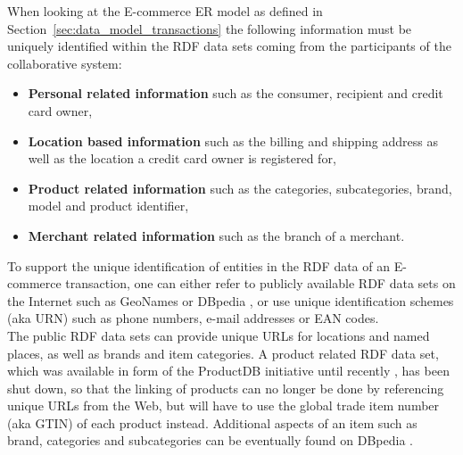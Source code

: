 When looking at the \gls{E-commerce} \gls{ER} model as defined in Section~\ref{sec:data_model_transactions} the following information must be uniquely identified within the \gls{RDF} data sets coming from the participants of the collaborative system: \@

\begin{itemize}
	\item \textbf{Personal related information} such as the consumer, recipient and credit card owner,
	\item \textbf{Location based information} such as the billing and shipping address as well as the location a credit card owner is registered for,
	\item \textbf{Product related information} such as the categories, subcategories, brand, model and product identifier,
	\item \textbf{Merchant related information} such as the branch of a merchant.
\end{itemize}

To support the unique identification of entities in the \gls{RDF} data of an \gls{E-commerce} transaction, one can either refer to publicly available \gls{RDF} data sets on the Internet such as GeoNames \citep{geonames} or DBpedia \citep{dbPedia.org}, or use unique identification schemes (aka \gls{URN}) such as phone numbers, e-mail addresses or \gls{EAN} codes. \\

The public \gls{RDF} data sets can provide unique \gls{URL}s for locations and named places, as well as brands and item categories. A product related \gls{RDF} data set, which was available in form of the ProductDB initiative until recently \citep{bouzidi2014product}, has been shut down, so that the linking of products can no longer be done by referencing unique \gls{URL}s from the Web, but will have to use the global trade item number (aka \gls{GTIN}) of each product instead. Additional aspects of an item such as brand, categories and subcategories can be eventually found on DBpedia \citep{dbPedia.org}. \\

